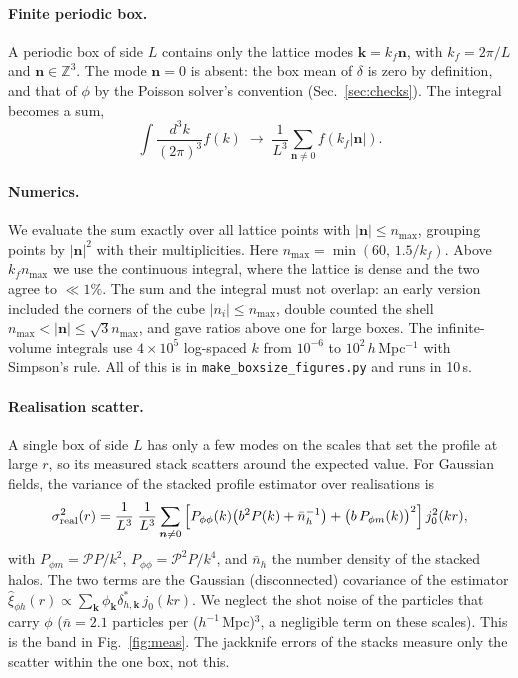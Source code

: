 \documentclass[11pt,a4paper]{article}
\newcommand{\fp}[1]{\nolinkurl{#1}}
\newcommand{\Mpch}{$h^{-1}$\,Mpc}
\begin{document}
\paragraph{Finite periodic box.}
A periodic box of side $L$ contains only the lattice modes $\boldsymbol k = k_f\boldsymbol n$, with
$k_f=2\pi/L$ and $\boldsymbol n\in\mathbb Z^3$. The mode $\boldsymbol n=0$ is absent: the box mean of $\delta$ is
zero by definition, and that of $\phi$ by the Poisson solver's convention (Sec.~\ref{sec:checks}). The integral
becomes a sum,
\begin{equation}
  \int\!\frac{d^3k}{(2\pi)^3} f(k) \;\longrightarrow\; \frac{1}{L^3}\sum_{\boldsymbol n\ne0} f(k_f|\boldsymbol n|).
  \label{eq:lattice}
\end{equation}

\paragraph{Numerics.}
We evaluate the sum exactly over all lattice points with $|\boldsymbol n|\le n_{\max}$, grouping points by $|\boldsymbol n|^2$
with their multiplicities. Here $n_{\max}=\min(60,\,1.5/k_f)$. Above $k_f n_{\max}$ we use the continuous integral,
where the lattice is dense and the two agree to $\ll1\%$. The sum and the integral must not overlap: an early version
included the corners of the cube $|n_i|\le n_{\max}$, double counted the shell $n_{\max}<|\boldsymbol n|\le\sqrt3n_{\max}$,
and gave ratios above one for large boxes. The infinite-volume integrals use $4\times10^5$ log-spaced $k$ from
$10^{-6}$ to $10^2$\,$h$\,Mpc$^{-1}$ with Simpson's rule. All of this is in \fp{make_boxsize_figures.py} and runs
in 10\,s.

\paragraph{Realisation scatter.}
A single box of side $L$ has only a few modes on the scales that set the profile at large $r$, so its measured stack
scatters around the expected value. For Gaussian fields, the variance of the stacked profile estimator over
realisations is
\begin{equation}
  \sigma^2_{\rm real}(r) = \frac{1}{L^3}\;\frac{1}{L^3}\sum_{\boldsymbol n\ne0}
  \Big[P_{\phi\phi}(k)\big(b^2P(k)+\bar n_h^{-1}\big) + \big(b\,P_{\phi m}(k)\big)^2\Big]\,j_0^2(kr),
  \label{eq:cv}
\end{equation}
with $P_{\phi m}=\mathcal{P}P/k^2$, $P_{\phi\phi}=\mathcal{P}^2P/k^4$, and $\bar n_h$ the number density of the
stacked halos. The two terms are the Gaussian (disconnected) covariance of the estimator
$\hat\xi_{\phi h}(r)\propto\sum_{\boldsymbol k}\phi_{\boldsymbol k}\delta^*_{h,\boldsymbol k}\,j_0(kr)$. We
neglect the shot noise of the particles that carry $\phi$ ($\bar n = 2.1$ particles per (\Mpch)$^3$, a negligible
term on these scales). This is the band in Fig.~\ref{fig:meas}. The jackknife errors of the stacks measure only the scatter
within the one box, not this.
\end{document}
